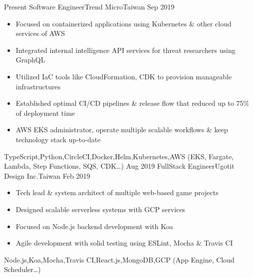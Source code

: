 \begin{experiences}
  \experience
    {Present}       {Software Engineer}{Trend Micro}{Taiwan}
    {Sep 2019}      {
                      \begin{itemize}
                        \item{Focused on containerized applications using Kubernetes \& other cloud services of AWS}
                        \item{Integrated internal intelligence API services for threat researchers using GraphQL}
                        \item{Utilized IaC tools like CloudFormation, CDK to provision manageable infrastructures}
                        \item{Established optimal CI/CD pipelines \& release flow that reduced up to 75\% of deployment time}
                        \item{AWS EKS administrator, operate multiple scalable workflows \& keep technology stack up-to-date}
                      \end{itemize}
                    }
                    {TypeScript,Python,CircleCI,Docker,Helm,Kubernetes,{AWS (EKS, Fargate, Lambda, Step Functions, SQS, CDK\ldots)}}
  \emptySeparator
  \experience
    {Aug 2019}      {FullStack Engineer}{Ugotit Design Inc.}{Taiwan}
    {Feb 2019}      {
                      \begin{itemize}
                        \item{Tech lead \& system architect of multiple web‐based game projects}
                        \item{Designed scalable serverless systems with GCP services}
                        \item{Focused on Node.js backend development with Koa}
                        \item{Agile development with solid testing using ESLint, Mocha \& Travis CI}
                      \end{itemize}
                    }
                    {Node.js,Koa,Mocha,Travis CI,React.js,MongoDB,{GCP (App Engine, Cloud Scheduler\ldots)}}
\end{experiences}
